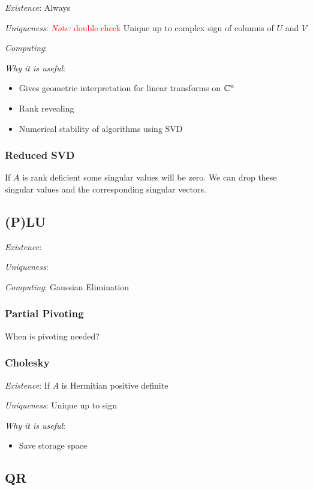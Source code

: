 \documentclass[12pt]{article}
\newcommand{\note}[1]{\textcolor{red}{\textit{Note:} #1}}
\begin{document}
\textit{Existence}:
Always

\textit{Uniqueness}:
\note{double check}
Unique up to complex sign of columns of \( U \) and \( V \)

\textit{Computing}:

\textit{Why it is useful}:
\begin{itemize}[nolistsep]
    \item Gives geometric interpretation for linear transforms on \( \mathbb{C}^n \)
    \item Rank revealing
    \item Numerical stability of algorithms using SVD
\end{itemize}

\subsubsection{Reduced SVD}
If \( A \) is rank deficient some singular values will be zero. We can drop these singular values and the corresponding singular vectors.


\subsection{(P)LU}

\textit{Existence}:

\textit{Uniqueness}:

\textit{Computing}:
Gaussian Elimination 

\subsubsection{Partial Pivoting}

When is pivoting needed?

\subsubsection{Cholesky}
\label{sec:cholesky}
\textit{Existence}: If \( A \) is Hermitian positive definite

\textit{Uniqueness}: Unique up to sign

\textit{Why it is useful}:
\begin{itemize}[nolistsep]
    \item Save storage space
\end{itemize}

\subsection{QR}
\end{document}
